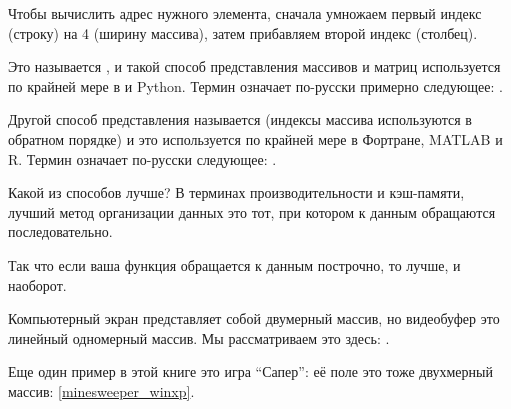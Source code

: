 Чтобы вычислить адрес нужного элемента, сначала умножаем первый индекс (строку) на 4 (ширину массива), 
затем прибавляем второй индекс (столбец).

Это называется , 
и такой способ представления массивов и матриц используется по крайней мере в \CCpp и Python. 
Термин  означает по-русски примерно следующее: .

Другой способ представления называется  (индексы массива используются в обратном порядке) 
и это используется по крайней мере в Фортране, MATLAB и R. 
Термин  означает по-русски
следующее: .

Какой из способов лучше?
В терминах производительности и кэш-памяти, лучший метод организации данных это тот,
при котором к данным обращаются последовательно.

Так что если ваша функция обращается к данным построчно, то  лучше,
и наоборот.






Компьютерный экран представляет собой двумерный массив, но видеобуфер это линейный
одномерный массив. 
Мы рассматриваем это здесь: .

Еще один пример в этой книге это игра ``Сапер'': её поле это тоже двухмерный массив: \ref{minesweeper_winxp}.

